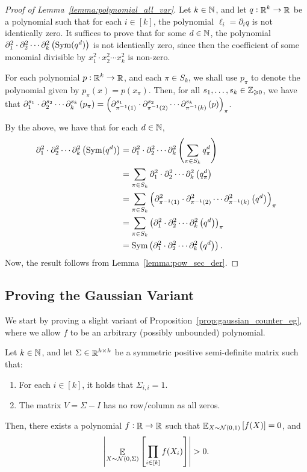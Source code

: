 \begin{proof}[Proof of Lemma~\ref{lemma:polynomial_all_var}]
	Let $k\in \mathbb{N}$, and let $q:\mathop{\mathbb{R}}^k\to \mathop{\mathbb{R}}$ be a polynomial such that for each $i\in [k]$, the polynomial $\ell_i=\partial_iq$ is not identically zero.
	It suffices to prove that for some $d\in \mathbb{N}$, the polynomial $\partial_1^{2}\cdot\partial_2^{2}\cdots \partial_k^{2}\left( \textnormal{Sym}(q^d) \right)$ is not identically zero, since then the coefficient of some monomial divisible by $x_1^2\cdot x_2^2\cdots x_k^2$ is non-zero.
	
	For each polynomial $p:\mathop{\mathbb{R}}^k\to \mathop{\mathbb{R}}$, and each $\pi\in S_k$, we shall use $p_\pi$ to denote the polynomial given by $p_\pi(x) = p(x_\pi)$.
	Then, for all $s_1,\dots,s_k\in \mathbb{Z}_{\geqslant 0}$, we have that $\partial_1^{s_1}\cdot\partial_2^{s_2}\cdots \partial_k^{s_k} \left( p_\pi \right) = \left( \partial_{\pi^{-1}(1)}^{s_1}\cdot\partial_{\pi^{-1}(2)}^{s_2}\cdots \partial_{\pi^{-1}(k)}^{s_k} \left( p \right) \right)_\pi$.
	
	By the above, we have that for each $d\in \mathbb{N}$,
	\begin{align*}
		\partial_1^{2}\cdot\partial_2^{2}\cdots \partial_k^{2}\left( \textnormal{Sym}(q^d) \right) 
		&=  \partial_1^{2}\cdot\partial_2^{2}\cdots \partial_k^{2}\left( \sum_{\pi\in S_k}q_\pi^d \right)
		\\&= \sum_{\pi\in S_k} \partial_1^{2}\cdot\partial_2^{2}\cdots \partial_k^{2}\left( q_\pi^d \right)
		\\&= \sum_{\pi\in S_k} \left( \partial_{\pi^{-1}(1)}^{2}\cdot\partial_{\pi^{-1}(2)}^{2}\cdots \partial_{\pi^{-1}(k)}^{2} \left( q^d \right) \right)_\pi
		\\&= \sum_{\pi\in S_k} \left( \partial_{1}^{2}\cdot\partial_{2}^{2}\cdots \partial_{k}^{2} \left( q^d \right) \right)_\pi
		\\&= \textnormal{Sym}\left( \partial_1^{2}\cdot\partial_2^{2}\cdots \partial_k^{2}\left( q^d \right) \right).
	\end{align*}	
	Now, the result follows from Lemma~\ref{lemma:pow_sec_der}.
\end{proof}

\subsection{Proving the Gaussian Variant}

We start by proving a slight variant of Proposition~\ref{prop:gaussian_counter_eg}, where we allow $f$ to be an arbitrary (possibly unbounded) polynomial.

\begin{lemma}\label{lemma:hermite_counter_eg}
	Let $k\in \mathbb{N}$, and let $\Sigma\in \mathop{\mathbb{R}}^{k\times k}$ be a symmetric positive semi-definite matrix such that:
	\begin{enumerate}
		\item For each $i\in [k]$, it holds that $\Sigma_{i,i} = 1$.
		\item The matrix $V = \Sigma - I$ has no row/column as all zeros.
	\end{enumerate}
	Then, there exists a polynomial $f:\mathop{\mathbb{R}}\to \mathop{\mathbb{R}}$ such that $\mathop{\mathbb{E}}_{X\sim \mathcal N(0,1)} \left[ f(X) \right] = 0$, and \[ \left|\mathop{\mathbb{E}}_{X\sim \mathcal N(0, \Sigma)}\left[ \prod_{i\in [k]} f(X_i) \right]\right| > 0 .\]
\end{lemma}

